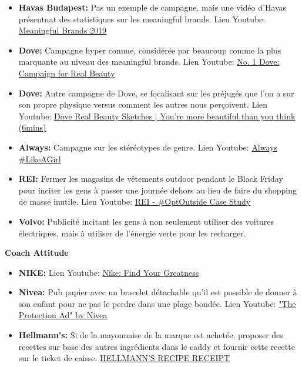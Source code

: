 \begin{itemize}
    \item \textbf{Havas Budapest:} Pas un exemple de campagne, mais une vidéo d'Havas présentnat des statistiques sur les meaningful brands. Lien Youtube: \href{https://www.youtube.com/watch?v=w2m9NpQD9mE}{Meaningful Brands 2019}
    \item \textbf{Dove:} Campagne hyper connue, considérée par beaucoup comme la plus marquante au niveau des meaningful brands. Lien Youtube: \href{https://www.youtube.com/watch?v=wpM499XhMJQ}{No. 1 Dove: Campaign for Real Beauty}
    \item \textbf{Dove:} Autre campagne de Dove, se focalisant sur les préjugés que l'on a sur son propre physique versus comment les autres nous perçoivent. Lien Youtube: \href{https://www.youtube.com/watch?v=litXW91UauE}{Dove Real Beauty Sketches | You’re more beautiful than you think (6mins)}
    \item \textbf{Always:} Campagne sur les stéréotypes de genre. Lien Youtube: \href{https://www.youtube.com/watch?v=XjJQBjWYDTs}{Always \#LikeAGirl}
    \item \textbf{REI:} Fermer les magasins de vêtements outdoor pendant le Black Friday pour inciter les gens à passer une journée dehors au lieu de faire du shopping de masse inutile. Lien Youtube: \href{https://www.youtube.com/watch?v=lMsxrJeJ8lU}{REI - \#OptOutside Case Study}
    \item \textbf{Volvo:} Publicité incitant les gens à non seulement utiliser des voitures électriques, mais à utiliser de l'énergie verte pour les recharger.\\
\end{itemize}


\textbf{Coach Attitude}

\begin{itemize}
    \item \textbf{NIKE:} Lien Youtube: \href{https://www.youtube.com/watch?v=WYP9AGtLvRg}{Nike: Find Your Greatness}
    \item \textbf{Nivea:} Pub papier avec un bracelet détachable qu'il est possible de donner à son enfant pour ne pas le perdre dans une plage bondée. Lien Youtube: \href{https://www.youtube.com/watch?v=nZ532wkhHYs}{"The Protection Ad" by Nivea}
    \item \textbf{Hellmann's:} Si de la mayonnaise de la marque est achetée, proposer des recettes sur base des autres ingrédients dans le caddy et fournir cette recette sur le ticket de caisse. \href{https://www.youtube.com/watch?v=h3aCVrcnFOQ}{HELLMANN'S RECIPE RECEIPT}\\
\end{itemize}


